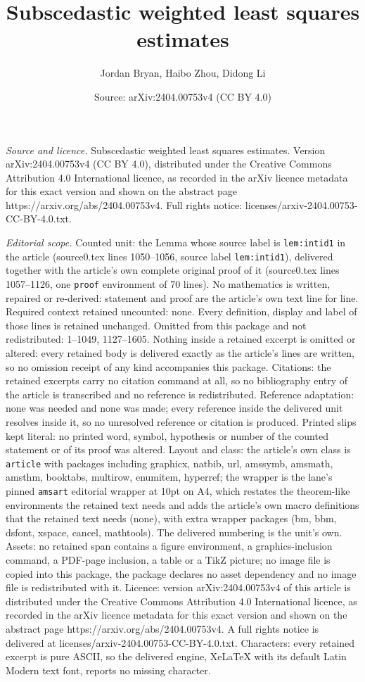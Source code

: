 \documentclass[10pt,a4paper]{amsart}
\title[Subscedastic weighted least squares estimates]{Subscedastic weighted least squares estimates}
\author{Jordan Bryan, Haibo Zhou, Didong Li}
\date{Source: arXiv:2404.00753v4 (CC BY 4.0)}
\begin{document}
\maketitle

\noindent\emph{Source and licence.} Subscedastic weighted least squares estimates. Version arXiv:2404.00753v4 (CC BY 4.0), distributed under the Creative Commons Attribution 4.0 International licence, as recorded in the arXiv licence metadata for this exact version and shown on the abstract page https://arxiv.org/abs/2404.00753v4. Full rights notice: licenses/arxiv-2404.00753-CC-BY-4.0.txt.\par\smallskip

\noindent\textit{Editorial scope.} Counted unit: the Lemma whose source label is \texttt{lem:intid1} in the article (source0.tex lines 1050--1056, source label \texttt{lem:intid1}), delivered together with the article's own complete original proof of it (source0.tex lines 1057--1126, one \texttt{proof} environment of 70 lines). No mathematics is written, repaired or re-derived: statement and proof are the article's own text line for line. Required context retained uncounted: none. Every definition, display and label of those lines is retained unchanged. Omitted from this package and not redistributed: 1--1049, 1127--1605. Nothing inside a retained excerpt is omitted or altered: every retained body is delivered exactly as the article's lines are written, so no omission receipt of any kind accompanies this package. Citations: the retained excerpts carry no citation command at all, so no bibliography entry of the article is transcribed and no reference is redistributed. Reference adaptation: none was needed and none was made; every reference inside the delivered unit resolves inside it, so no unresolved reference or citation is produced. Printed slips kept literal: no printed word, symbol, hypothesis or number of the counted statement or of its proof was altered. Layout and class: the article's own class is \texttt{article} with packages including graphicx, natbib, url, amssymb, amsmath, amsthm, booktabs, multirow, enumitem, hyperref; the wrapper is the lane's pinned \texttt{amsart} editorial wrapper at 10pt on A4, which restates the theorem-like environments the retained text needs and adds the article's own macro definitions that the retained text needs (none), with extra wrapper packages (bm, bbm, dsfont, xspace, cancel, mathtools). The delivered numbering is the unit's own. Assets: no retained span contains a figure environment, a graphics-inclusion command, a PDF-page inclusion, a table or a TikZ picture; no image file is copied into this package, the package declares no asset dependency and no image file is redistributed with it. Licence: version arXiv:2404.00753v4 of this article is distributed under the Creative Commons Attribution 4.0 International licence, as recorded in the arXiv licence metadata for this exact version and shown on the abstract page https://arxiv.org/abs/2404.00753v4. A full rights notice is delivered at licenses/arxiv-2404.00753-CC-BY-4.0.txt. Characters: every retained excerpt is pure ASCII, so the delivered engine, XeLaTeX with its default Latin Modern text font, reports no missing character.
\end{document}
